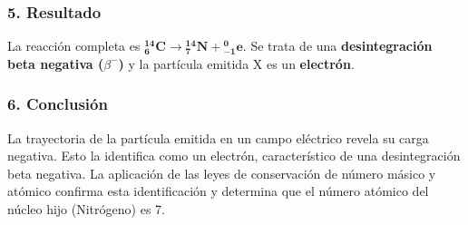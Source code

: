 \subsubsection*{5. Resultado}
\begin{cajaresultado}
La reacción completa es $\boldsymbol{{}_{6}^{14}\text{C}\rightarrow{}_{7}^{14}\text{N}+{}_{-1}^{0}e}$.
Se trata de una \textbf{desintegración beta negativa ($\beta^-$)} y la partícula emitida X es un \textbf{electrón}.
\end{cajaresultado}
\subsubsection*{6. Conclusión}
\begin{cajaconclusion}
La trayectoria de la partícula emitida en un campo eléctrico revela su carga negativa. Esto la identifica como un electrón, característico de una desintegración beta negativa. La aplicación de las leyes de conservación de número másico y atómico confirma esta identificación y determina que el número atómico del núcleo hijo (Nitrógeno) es 7.
\end{cajaconclusion}
\newpage
